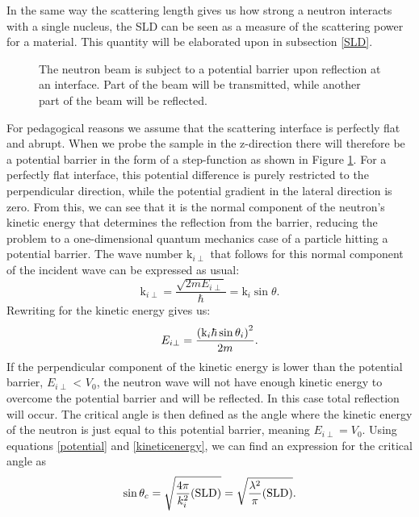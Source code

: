 In the same way the scattering length gives us how strong a neutron interacts with a single nucleus, the SLD can be seen as a measure of the scattering power for a material. This quantity will be elaborated upon in subsection \ref{SLD}.
\begin{figure}
	\centering
	\def\svgwidth{\textwidth}
	
	\caption{The neutron beam is subject to a potential barrier upon reflection at an interface. Part of the beam will be transmitted, while another part of the beam will be reflected.}
	\label{fresnelreflection}
\end{figure}
For pedagogical reasons we assume that the scattering interface is perfectly flat and abrupt. When we probe the sample in the z-direction there will therefore be a potential barrier in the form of a step-function as shown in Figure \ref{fresnelreflection}. For a perfectly flat interface, this potential difference is purely restricted to the perpendicular direction, while the potential gradient in the lateral direction is zero. From this, we can see that it is the normal component of the neutron's kinetic energy that determines the reflection from the barrier, reducing the problem to a one-dimensional quantum mechanics case of a particle hitting a potential barrier. The wave number $\textrm{k}_{i\perp}$ that follows for this normal component of the incident wave can be expressed as usual:
\begin{equation}\label{perpendicular_ki}
	\textrm{k}_{i \perp} = \frac{\sqrt{2mE_{i \perp}}}{\hbar} = \textrm{k}_{i} \sin \theta.
\end{equation}
Rewriting for the kinetic energy gives us:
\begin{equation}\label{kineticenergy}
	E_{i\perp} = \frac{\qty (\textrm{k}_i \hbar \sin\theta_i)^2}{2 m}.
\end{equation}
If the perpendicular component of the kinetic energy is lower than the potential barrier, $E_{i\perp}$ < $V_0$, the neutron wave will not have enough kinetic energy to overcome the potential barrier and will be reflected. In this case total reflection will occur. The critical angle is then defined as the angle where the kinetic energy of the neutron is just equal to this potential barrier, meaning  $E_{i\perp} = V_0$. Using equations  \ref{potential} and \ref{kineticenergy}, we can find an expression for the critical angle as
\begin{equation}\label{critical_angle_expression}
	\sin\theta_c = \sqrt{\frac{4\pi}{k_i^2} \qty(\textrm{SLD})} = \sqrt{\frac{\lambda^2}{\pi}(\textrm{SLD})}.
\end{equation}
